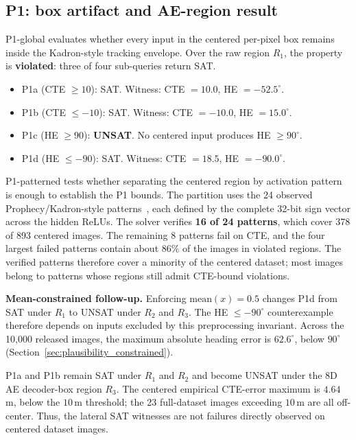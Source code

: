 \documentclass[twocolumn,smallextended,runningheads]{svjour3}
\begin{document}
\subsection{P1: box artifact and AE-region result}
\label{sec:probe_p1}
\label{sec:p1_results}

P1-global evaluates whether every input in the centered per-pixel box remains inside the Kadron-style tracking envelope. Over the raw region $R_1$, the property is \textbf{violated}: three of four sub-queries return SAT.
\begin{itemize}[nosep]
  \item P1a (CTE $\ge 10$): SAT. Witness: CTE $= 10.0$, HE $= -52.5^\circ$.
  \item P1b (CTE $\le -10$): SAT. Witness: CTE $= -10.0$, HE $= 15.0^\circ$.
  \item P1c (HE $\ge 90$): \textbf{UNSAT}. No centered input produces HE $\ge 90^\circ$.
  \item P1d (HE $\le -90$): SAT. Witness: CTE $= 18.5$, HE $= -90.0^\circ$.
\end{itemize}

P1-patterned tests whether separating the centered region by activation pattern is enough to establish the P1 bounds. The partition uses the 24 observed Prophecy/Kadron-style patterns~\cite{prophecy2019,kadron2021}, each defined by the complete 32-bit sign vector across the hidden ReLUs. The solver verifies \textbf{16 of 24 patterns}, which cover 378 of 893 centered images. The remaining 8 patterns fail on CTE, and the four largest failed patterns contain about $86\%$ of the images in violated regions. The verified patterns therefore cover a minority of the centered dataset; most images belong to patterns whose regions still admit CTE-bound violations.

\textbf{Mean-constrained follow-up.} Enforcing $\text{mean}(x) = 0.5$ changes P1d from SAT under $R_1$ to UNSAT under $R_2$ and $R_3$. The HE $\le -90^\circ$ counterexample therefore depends on inputs excluded by this preprocessing invariant. Across the 10{,}000 released images, the maximum absolute heading error is $62.6^\circ$, below $90^\circ$ (Section~\ref{sec:plausibility_constrained}).

P1a and P1b remain SAT under $R_1$ and $R_2$ and become UNSAT under the 8D AE decoder-box region $R_3$. The centered empirical CTE-error maximum is $4.64$\,m, below the $10$\,m threshold; the 23 full-dataset images exceeding $10$\,m are all off-center. Thus, the lateral SAT witnesses are not failures directly observed on centered dataset images.
\end{document}
